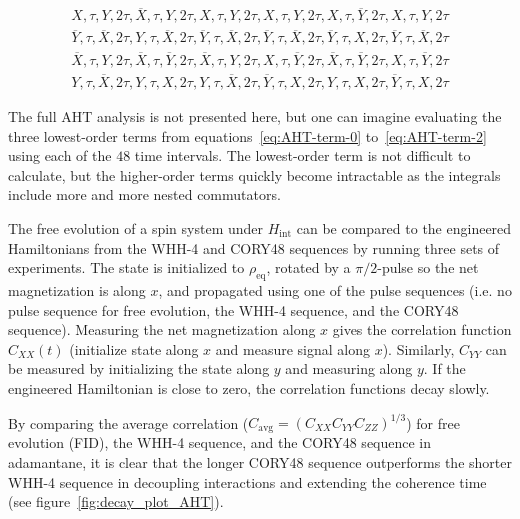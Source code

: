 \begin{equation}\label{eq:CORY48}
\begin{aligned}
    X, \tau, Y, 2\tau, \overline{X}, \tau, Y, 2\tau, X, \tau, Y, 2\tau,
    X, \tau, Y, 2\tau, X, \tau, \overline{Y}, 2\tau, X, \tau, Y, 2\tau \\
    \overline{Y}, \tau, \overline{X}, 2\tau, Y, \tau, \overline{X}, 2\tau,
    \overline{Y}, \tau, \overline{X}, 2\tau, \overline{Y}, \tau, \overline{X},
    2\tau, \overline{Y}, \tau, X, 2\tau, \overline{Y}, \tau, \overline{X},
    2\tau \\
    \overline{X}, \tau, Y, 2\tau, \overline{X}, \tau, \overline{Y}, 2\tau,
    \overline{X}, \tau, Y, 2\tau, X, \tau, \overline{Y}, 2\tau, \overline{X},
    \tau, \overline{Y}, 2\tau, X, \tau, \overline{Y}, 2\tau \\
    Y, \tau, \overline{X}, 2\tau, Y, \tau, X, 2\tau, Y, \tau, \overline{X}, 2\tau, \overline{Y}, \tau, X, 2\tau, Y, \tau, X, 2\tau, \overline{Y}, \tau, X, 2\tau
\end{aligned}
\end{equation}


The full AHT analysis is not presented here, but one can imagine evaluating the three lowest-order terms from equations~\ref{eq:AHT-term-0} to~\ref{eq:AHT-term-2} using each of the $48$ time intervals. The lowest-order term is not difficult to calculate, but the higher-order terms quickly become intractable as the integrals include more and more nested commutators.

The free evolution of a spin system under $H_{\text{int}}$ can be compared to the engineered Hamiltonians from the WHH-4 and CORY48 sequences by running three sets of experiments. The state is initialized to $\rho_\text{eq}$, rotated by a $\pi/2$-pulse so the net magnetization is along $x$, and propagated using one of the pulse sequences (i.e. no pulse sequence for free evolution, the WHH-4 sequence, and the CORY48 sequence). Measuring the net magnetization along $x$ gives the correlation function $C_{XX}(t)$ (initialize state along $x$ and measure signal along $x$). Similarly, $C_{YY}$ can be measured by initializing the state along $y$ and measuring along $y$.
If the engineered Hamiltonian is close to zero, the correlation functions decay slowly.

By comparing the average correlation ($C_{\text{avg}} = (C_{XX}C_{YY}C_{ZZ})^{1/3}$) for free evolution (FID), the WHH-4 sequence, and the CORY48 sequence in adamantane, it is clear that the longer CORY48 sequence outperforms the shorter WHH-4 sequence in decoupling interactions and extending the coherence time (see figure~\ref{fig:decay_plot_AHT}).


